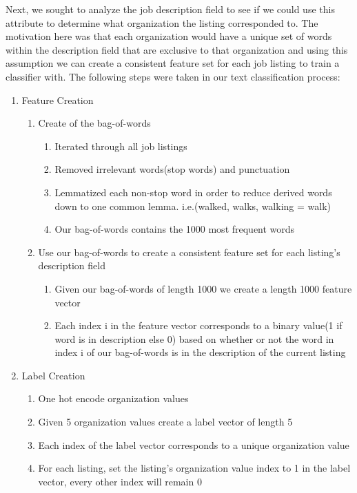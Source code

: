 Next, we sought to analyze the job description field to see if we could use this attribute to determine what organization the listing corresponded to. The motivation here was that each organization would have a unique set of words within the description field that are exclusive to that organization and using this assumption we can create a consistent feature set for each job listing to train a classifier with. The following steps were taken in our text classification process:
\begin{enumerate}
	\item Feature Creation
	\begin{enumerate}
		\item Create of the bag-of-words 
		\begin{enumerate}
			\item Iterated through all job listings
			\item Removed irrelevant words(stop words) and punctuation
			\item Lemmatized each non-stop word in order to reduce derived words down to one common lemma. i.e.(walked, walks, walking = walk)
			\item Our bag-of-words contains the 1000 most frequent words 
		\end{enumerate}
			\item Use our bag-of-words to create a consistent feature set for each listing's description field
		\begin{enumerate}
			\item Given our bag-of-words of length 1000 we create a length 1000 feature vector
			\item Each index i in the feature vector corresponds to a binary value(1 if word is in description else 0) based on whether or not the word in index i of our bag-of-words is in the description of the current listing
		\end{enumerate}
	\end{enumerate}
	\item Label Creation
	\begin{enumerate}
		\item One hot encode organization values
		\item Given 5 organization values create a label vector of length 5 
		\item Each index of the label vector corresponds to a unique organization value 
		\item For each listing, set the listing's organization value index to 1 in the label vector, every other index will remain 0
	\end{enumerate}
\end{enumerate}

